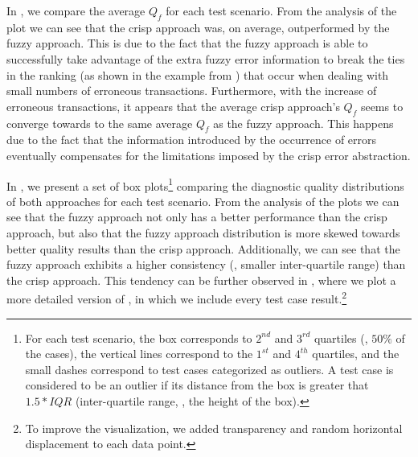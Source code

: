 In , we compare the average $Q_f$ for each test scenario.
%
From the analysis of the plot we can see that the crisp approach was,
on average, outperformed by the fuzzy approach.
%
This is due to the fact that the fuzzy approach is able to
successfully take advantage of the extra fuzzy error information to
break the ties in the ranking (as shown in the example from
) that occur when dealing with
small numbers of erroneous transactions.
%
Furthermore, with the increase of erroneous transactions, it appears
that the average crisp approach's $Q_f$ seems to converge towards to
the same average $Q_f$ as the fuzzy approach.
%
This happens due to the fact that the information introduced by the
occurrence of errors eventually compensates for the limitations
imposed by the crisp error abstraction.
%

In , we present a set of box plots\footnote{For
  each test scenario, the box corresponds to $2^{nd}$ and $3^{rd}$
  quartiles (\ie, $50\%$ of the cases), the vertical lines correspond
  to the $1^{st}$ and $4^{th}$ quartiles, and the small dashes
  correspond to test cases categorized as outliers. A test case is
  considered to be an outlier if its distance from the box is greater
  that $1.5 * IQR$ (inter-quartile range, \ie, the height of the
  box).}  comparing the diagnostic quality distributions of both
approaches for each test scenario.
%
From the analysis of the plots we can see that the fuzzy approach not
only has a better performance than the crisp approach, but also that
the fuzzy approach distribution is more skewed towards better quality
results than the crisp approach.
%
Additionally, we can see that the fuzzy approach exhibits a higher
consistency (\ie, smaller inter-quartile range) than the crisp
approach.
%
This tendency can be further observed in ,
where we plot a more detailed version of , in
which we include every test case result.\footnote{To improve the
  visualization, we added transparency and random horizontal
  displacement to each data point.}
%


